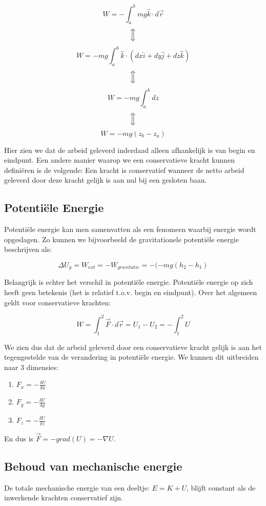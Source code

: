 \documentclass[12pt,a4paper]{article}
\newcommand{\Luda}{\Big\Updownarrow}
\begin{document}
    $$W = -\int_{a}^{b}mg\hat{k} \cdot d\vec{r}$$
    $$\Luda$$
    $$W = -mg\int_{a}^{b}\hat{k}\cdot (dx\hat{i} + dy\hat{j} + dz\hat{k})$$
    $$\Luda$$
    $$W = -mg\int_{a}^{b}dz$$
    $$\Luda$$
    $$W = -mg(z_b - z_a)$$

    Hier zien we dat de arbeid geleverd inderdaad alleen afhankelijk is van begin en eindpunt. Een andere manier waarop
    we een conservatieve kracht kunnen definiëren is de volgende: Een kracht is conservatief wanneer de netto arbeid geleverd
    door deze kracht gelijk is aan nul bij een gesloten baan. 
    
    \subsection{Potentiële Energie}
    Potentiële energie kan men samenvatten als een fenomeen waarbij energie wordt opgeslagen. Zo kunnen we bijvoorbeeld
    de gravitationele potentiële energie beschrijven als:
    
    $$\Delta U_g = W_{ext} = -W_{gravitatie} = -(-mg(h_2 - h_1)$$
    
    Belangrijk is echter het verschil in potentiële energie. Potentiële energie op zich heeft geen betekenis (het is relatief t.o.v.
    begin en eindpunt). Over het algemeen geldt voor conservatieve krachten:
    
    $$W = \int_{1}^{2}\vec{F}\cdot d\vec{r} = U_1 - U_2 = -\int_{1}^{2} U$$
    
    We zien dus dat de arbeid geleverd door een conservatieve kracht gelijk is aan het tegengestelde van de verandering in potentiële energie. We kunnen
    dit uitbreiden naar 3 dimensies:
    
    \begin{enumerate}
    	\item $F_x = -\frac{\delta U}{\delta x}$
    	\item $F_y = -\frac{\delta U}{\delta y}$
    	\item $F_z = -\frac{\delta U}{\delta z}$
    \end{enumerate}
    
    En dus is $\vec{F} = -grad(U) = -\mathbb{\nabla}{U}$.

    \subsection{Behoud van mechanische energie}
    De totale mechanische energie van een deeltje: $E = K + U$,
    blijft constant als de inwerkende krachten conservatief zijn.
    
\end{document}

